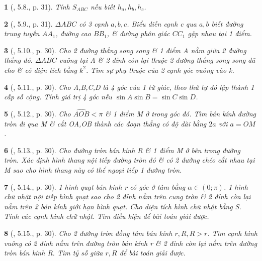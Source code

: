 \documentclass{article}
\newtheorem{baitoan}{}
\begin{document}
\begin{baitoan}[\cite{Hai_Hung_Thu_Tung2022_tap_1}, 5.8., p. 31]
	Tính $S_{ABC}$ nếu biết $h_a,h_b,h_c$.
\end{baitoan}

\begin{baitoan}[\cite{Hai_Hung_Thu_Tung2022_tap_1}, 5.9., p. 31]
	$\Delta ABC$ có 3 cạnh $a,b,c$. Biểu diễn cạnh c qua $a,b$ biết đường trung tuyến $AA_1$, đường cao $BB_1$, \& đường phân giác $CC_1$ gặp nhau tại 1 điểm.
\end{baitoan}

\begin{baitoan}[\cite{Hai_Hung_Thu_Tung2022_tap_1}, 5.10., p. 30]
	Cho 2 đường thẳng song song \& 1 điểm A nằm giữa 2 đường thẳng đó. $\Delta ABC$ vuông tại A \& 2 đỉnh còn lại thuộc 2 đường thẳng song song đã cho \& có diện tích bằng $k^2$. Tìm sự phụ thuộc của 2 cạnh góc vuông vào k.
\end{baitoan}

\begin{baitoan}[\cite{Hai_Hung_Thu_Tung2022_tap_1}, 5.11., p. 30]
	Cho A,B,C,D là 4 góc của 1 tứ giác, theo thứ tự đó lập thành 1 cấp số cộng. Tính giá trị 4 góc nếu $\sin A\sin B = \sin C\sin D$.
\end{baitoan}

\begin{baitoan}[\cite{Hai_Hung_Thu_Tung2022_tap_1}, 5.12., p. 30]
	Cho $\widehat{AOB} < \pi$ \& 1 điểm M ở trong góc đó. Tìm bán kính đường tròn đi qua M \& cắt OA,OB thành các đoạn thẳng có độ dài bằng $2a$ với $a = OM$.
\end{baitoan}

\begin{baitoan}[\cite{Hai_Hung_Thu_Tung2022_tap_1}, 5.13., p. 30]
	Cho đường tròn bán kính R \& 1 điểm M ở bên trong đường tròn. Xác định hình thang nội tiếp đường tròn đó \& có 2 đường chéo cắt nhau tại M sao cho hình thang này có thể ngoại tiếp 1 đường tròn.
\end{baitoan}

\begin{baitoan}[\cite{Hai_Hung_Thu_Tung2022_tap_1}, 5.14., p. 30]
	1 hình quạt bán kính r có góc ở tâm bằng $\alpha\in(0;\pi)$. 1 hình chữ nhật nội tiếp hình quạt sao cho 2 đỉnh nằm trên cung tròn \& 2 đỉnh còn lại nằm trên 2 bán kính giới hạn hình quạt. Cho diện tích hình chữ nhật bằng S. Tính các cạnh hình chữ nhật. Tìm điều kiện để bài toán giải được.
\end{baitoan}

\begin{baitoan}[\cite{Hai_Hung_Thu_Tung2022_tap_1}, 5.15., p. 30]
	Cho 2 đường tròn đồng tâm bán kính $r,R,R > r$. Tìm cạnh hình vuông có 2 đỉnh nằm trên đường tròn bán kính r \& 2 đỉnh còn lại nằm trên đường tròn bán kính R. Tìm tỷ số giữa $r,R$ để bài toán giải được.
\end{baitoan}
\end{document}
